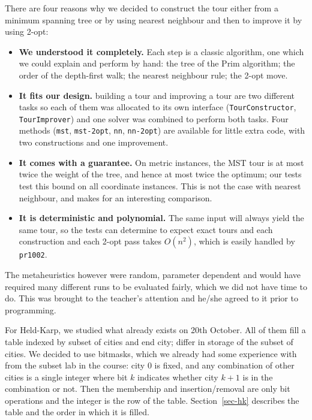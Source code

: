 \documentclass[10pt,a4paper]{article}
\begin{document}
\noindent There are four reasons why we decided to construct the tour either from a minimum spanning tree or by using nearest neighbour and then to improve it by using 2-opt:
\begin{itemize}
  \item \textbf{We understood it completely.} Each step is a classic algorithm, one which we could explain and perform by hand: the tree of the Prim algorithm; the order of the depth-first walk; the nearest neighbour rule; the 2-opt move.
  \item \textbf{It fits our design.} building a tour and improving a tour are two different tasks so each of them was allocated to its own interface (\texttt{TourConstructor}, \texttt{TourImprover}) and one solver was combined to perform both tasks. Four methods (\texttt{mst}, \texttt{mst-2opt}, \texttt{nn}, \texttt{nn-2opt}) are available for little extra code, with two constructions and one improvement.
  \item \textbf{It comes with a guarantee.} On metric instances, the MST tour is at most twice the weight of the tree, and hence at most twice the optimum; our tests test this bound on all coordinate instances. This is not the case with nearest neighbour, and makes for an interesting comparison.
  \item \textbf{It is deterministic and polynomial.} The same input will always yield the same tour, so the tests can determine to expect exact tours and each construction and each 2-opt pass takes $O(n^2)$, which is easily handled by \texttt{pr1002}.
\end{itemize}
The metaheuristics however were random, parameter dependent and would have required many different runs to be evaluated fairly, which we did not have time to do. This was brought to the teacher's attention and he/she agreed to it prior to programming.

For Held-Karp, we studied what already exists on 20th October. All of them fill a table indexed by subset of cities and end city; differ in storage of the subset of cities. We decided to use bitmasks, which we already had some experience with from the subset lab in the course: city 0 is fixed, and any combination of other cities is a single integer where bit \textbf{$k$} indicates whether city \textbf{$k+1$} is in the combination or not. Then the membership and insertion/removal are only bit operations and the integer is the row of the table. Section~\ref{sec-hk} describes the table and the order in which it is filled.
\end{document}
